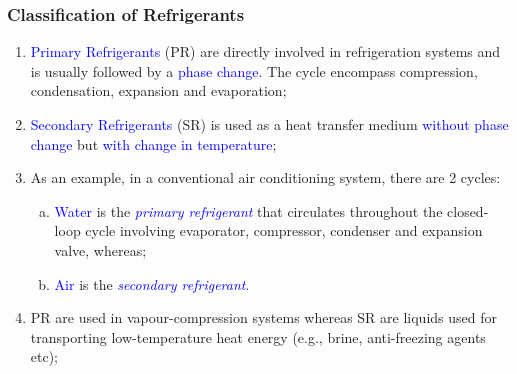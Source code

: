 \documentclass[10pt,compress]{beamer}
\begin{document}
\begin{frame}
 \frametitle{Classification of Refrigerants}
 \begin{enumerate}[1]\scriptsize
   \item <1-> \textcolor{blue}{Primary Refrigerants} (PR) are directly involved in refrigeration systems and is usually followed by a \textcolor{blue}{phase change}. The cycle encompass compression, condensation, expansion and evaporation;
   \item <2-> \textcolor{blue}{Secondary Refrigerants} (SR) is used as a heat transfer medium \textcolor{blue}{without phase change} but \textcolor{blue}{with change in temperature};
   \item <3-> As an example, in a conventional air conditioning system, there are 2 cycles: 
    \begin{enumerate}[(a)]\scriptsize
     \item <4-> \textcolor{blue}{Water} is the \textcolor{blue}{{\it primary refrigerant}} that circulates throughout the closed-loop cycle involving evaporator, compressor, condenser and expansion valve, whereas;
     \item <5-> \textcolor{blue}{Air} is the \textcolor{blue}{{\it secondary refrigerant}}.
    \end{enumerate}
    \item <6-> PR are used in vapour-compression systems whereas SR are liquids used for transporting low-temperature heat energy (e.g., brine, anti-freezing agents etc);
  \end{enumerate}
\end{frame}
\end{document}

